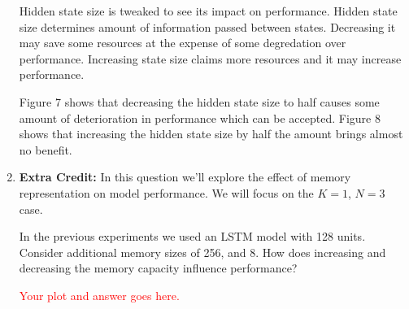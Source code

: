 \documentclass[12pt]{article}
\begin{document}
\begin{enumerate}[label=\alph*]
    \break
    \newline
    Hidden state size is tweaked to see its impact on performance. Hidden state size determines amount of information passed between states. Decreasing it may save some resources at the expense of some degredation over performance.
    Increasing state size claims more resources and it may increase performance.

    \break\newline
    Figure 7 shows that decreasing the hidden state size to half causes some amount of deterioration in performance which can be accepted.
    Figure 8 shows that increasing the hidden state size by half the amount brings almost no benefit.

    \break \newline

    \item \textbf{Extra Credit:} In this question we'll explore the effect of memory representation on model performance. We will focus on the $K=1$, $N=3$ case.
    
    In the previous experiments we used an LSTM model with 128 units. Consider additional memory sizes of 256, and 8. How does increasing and decreasing the memory capacity influence performance?
    
    \textcolor{red}{Your plot and answer goes here.}
    
\end{enumerate}


\newpage


\end{document}
